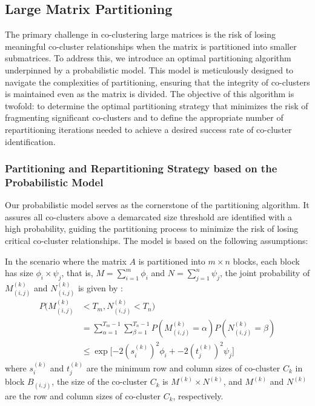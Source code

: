 \documentclass[journal]{IEEEtran}
\begin{document}
\subsection{Large Matrix Partitioning}
\label{subsec:large_matrix_partitioning}
The primary challenge in co-clustering large matrices is the risk of losing meaningful co-cluster relationships when the matrix is partitioned into smaller submatrices. To address this, we introduce an optimal partitioning algorithm underpinned by a probabilistic model. This model is meticulously designed to navigate the complexities of partitioning, ensuring that the integrity of co-clusters is maintained even as the matrix is divided. The objective of this algorithm is twofold: to determine the optimal partitioning strategy that minimizes the risk of fragmenting significant co-clusters and to define the appropriate number of repartitioning iterations needed to achieve a desired success rate of co-cluster identification.

\subsubsection{Partitioning and Repartitioning Strategy based on the Probabilistic Model}

Our probabilistic model serves as the cornerstone of the partitioning algorithm. It assures all co-clusters above a demarcated size threshold are identified with a high probability, guiding the partitioning process to minimize the risk of losing critical co-cluster relationships. The model is based on the following assumptions:

In the scenario where the matrix $A$ is partitioned into $m \times n$ blocks, each block has size $\phi_i \times \psi_j$, that is, $M=\sum_{i=1}^m \phi_i$ and $N=\sum_{j=1}^n \psi_j$, the joint probability of $M_{(i,j)}^{(k)}$ and $N_{(i,j)}^{(k)}$ is given by :
\begin{equation}
    \begin{split}
        P(M_{(i,j)}^{(k)} & < T_m, N_{(i,j)}^{(k)} < T_n)                                                                           \\
                          & = \sum_{\alpha=1}^{T_m-1} \sum_{\beta=1}^{T_n-1} P(M_{(i,j)}^{(k)} = \alpha) P(N_{(i,j)}^{(k)} = \beta) \\
                          & \le \exp[-2 (s_i^{(k)})^2 \phi_i + -2 (t_j^{(k)})^2 \psi_j\rbrack
    \end{split}
\end{equation}
where $s_i^{(k)}$ and $t_j^{(k)}$ are the minimum row and column sizes of co-cluster $C_k$ in block $B_{(i,j)}$, the size of the co-cluster $C_k$ is $M^{(k)} \times N^{(k)}$, and $M^{(k)}$ and $N^{(k)}$ are the row and column sizes of co-cluster $C_k$, respectively.
\end{document}
